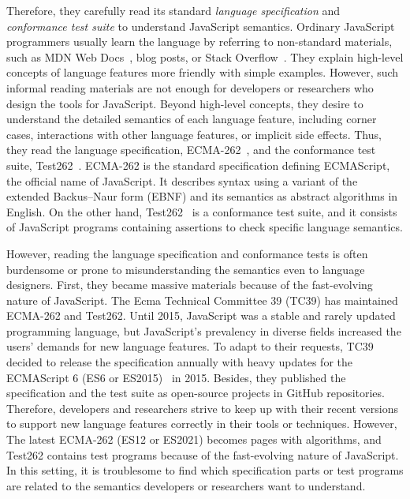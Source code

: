 Therefore, they carefully read its standard \textit{language specification} and
\textit{conformance test suite} to understand JavaScript semantics.  Ordinary
JavaScript programmers usually learn the language by referring to non-standard
materials, such as MDN Web Docs~\cite{mdn-doc}, blog posts, or Stack
Overflow~\cite{stackoverflow}.  They explain high-level concepts of language
features more friendly with simple examples.  However, such informal reading
materials are not enough for developers or researchers who design the tools for
JavaScript.  Beyond high-level concepts, they desire to understand the detailed
semantics of each language feature, including corner cases, interactions with
other language features, or implicit side effects. Thus, they read the language
specification, ECMA-262~\cite{es12}, and the conformance test suite,
Test262~\cite{test262}.  ECMA-262 is the standard specification defining
ECMAScript, the official name of JavaScript.  It describes syntax using a
variant of the extended Backus–Naur form (EBNF) and its semantics as abstract
algorithms in English.  On the other hand, Test262~\cite{test262} is a
conformance test suite, and it consists of JavaScript programs containing
assertions to check specific language semantics.

However, reading the language specification and conformance tests is often
burdensome or prone to misunderstanding the semantics even to language
designers.  First, they became massive materials because of the fast-evolving
nature of JavaScript.  The Ecma Technical Committee 39 (TC39) has maintained
ECMA-262 and Test262.  Until 2015, JavaScript was a stable and rarely updated
programming language, but JavaScript's prevalency in diverse fields increased
the users' demands for new language features.  To adapt to their requests, TC39
decided to release the specification annually with heavy updates for the
ECMAScript 6 (ES6 or ES2015)~\cite{es6} in 2015.  Besides, they published the
specification and the test suite as open-source projects in GitHub repositories.
Therefore, developers and researchers strive to keep up with their recent
versions to support new language features correctly in their tools or
techniques.  However, The latest ECMA-262 (ES12 or ES2021) becomes 
pages with  algorithms, and Test262 contains  test
programs because of the fast-evolving nature of JavaScript.  In this setting, it
is troublesome to find which specification parts or test programs are related to
the semantics developers or researchers want to understand.

